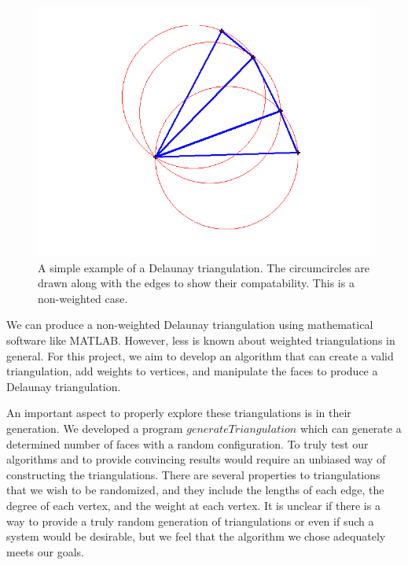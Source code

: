 \documentclass[12pt]{article}
\begin{document}
\begin{figure}
\centering
\includegraphics[scale = 0.6]{Pictures/genTri4.png}
\caption{A simple example of a Delaunay triangulation. The circumcircles are drawn along with the edges to show their compatability. This is a non-weighted case.}
\label{genTri}
\end{figure}

\noindent 

\noindent We can produce a non-weighted Delaunay triangulation using mathematical software like MATLAB. However, less is known about weighted triangulations in general. For this project, we aim to develop an algorithm that can create a valid triangulation, add weights to vertices, and manipulate the faces to produce a Delaunay triangulation.\newline

\noindent An important aspect to properly explore these triangulations is in their generation. We developed a program $generateTriangulation$ which can generate a determined number of faces with a random configuration. To truly test our algorithms and to provide convincing results would require an unbiased way of constructing the triangulations. There are several properties to triangulations that we wish to be randomized, and they include the lengths of each edge, the degree of each vertex, and the weight at each vertex. It is unclear if there is a way to provide a truly random generation of triangulations or even if such a system would be desirable, but we feel that the algorithm we chose adequately meets our goals.\newline
\end{document}
